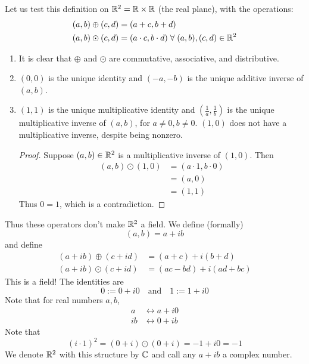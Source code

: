 Let us test this definition on $\mathbb{R}^{2} = \mathbb{R} \times \mathbb{R}$ (the real plane), with the operations:
\begin{align*}
    (a, b) \oplus (c, d) &= (a + c, b + d) \\
    (a, b) \odot (c, d) &= (a \cdot c, b \cdot d) \;\forall\; (a, b), (c, d) \in \mathbb{R}^{2}
\end{align*}
\begin{enumerate}[label=(\alph*)]
    \item It is clear that $\oplus$ and $\odot$ are commutative, associative, and distributive.
    \item $(0, 0)$ is the unique identity and $(-a, -b)$ is the unique additive inverse of $(a, b)$.
    \item $(1, 1)$ is the unique multiplicative identity and $(\frac{1}{a}, \frac{1}{b})$ is the unique multiplicative inverse of $(a, b)$, for $a \neq 0, b \neq 0$.
    $(1, 0)$ does not have a multiplicative inverse, despite being nonzero.
    \begin{proof}
        Suppose $(a, b) \in \mathbb{R}^{2}$ is a multiplicative inverse of $(1, 0)$. Then
        \begin{align*}
            (a, b) \odot (1, 0) &= (a \cdot 1, b \cdot 0) \\
            &= (a, 0) \\
            &= (1, 1)
        \end{align*}
        Thus $0 = 1$, which is a contradiction.
    \end{proof}
\end{enumerate}
Thus these operators don't make $\mathbb{R}^{2}$ a field. We define (formally) \[
    (a, b) = a + ib
\] and define
\begin{align*}
    (a + ib) \oplus (c + id) &= (a + c) + i(b + d) \\
    (a + ib) \odot (c + id) &= (ac - bd) + i(ad + bc)
\end{align*}
This is a field! The identities are \[
    0 := 0 + i0 \quad\text{and}\quad 1 := 1 + i0
\] Note that for real numbers $a, b$,
\begin{align*}
    a &\leftrightarrow a + i0 \\
    ib &\leftrightarrow 0 + ib
\end{align*}
Note that \[
    (i \cdot 1)^{2} = (0 + i) \odot (0 + i) = -1 + i0 = -1
\] We denote $\mathbb{R}^{2}$ with this structure by $\mathbb{C}$ and call any $a + ib$ a complex number.

